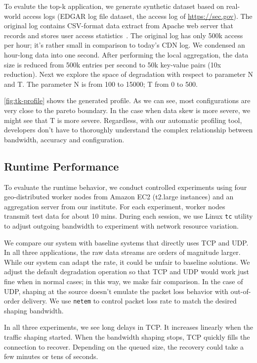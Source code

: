  To evalute the top-k application, we generate synthetic dataset
based on real-world access logs (EDGAR log file dataset, the access log of
\url{https://sec.gov}). The original log contains CSV-format data extract from
Apache web server that records and stores user access
statistics~\cite{edgarlog}. The original log has only 500k access per hour; it's
rather small in comparison to today's CDN log. We condensed an hour-long data
into one second. After performing the local aggregation, the data size is
reduced from 500k entries per second to 50k key-value pairs (10x reduction).
Next we explore the space of degradation with respect to parameter N and T.  The
parameter N is from 100 to 15000; T from 0 to 500.

\autoref{fig:tk-profile} shows the generated profile. As we can see, most
configurations are very close to the pareto boundary. In the case when data skew
is more severe, we might see that T is more severe. Regardless, with our
automatic profiling tool, developers don't have to thoroughly understand the
complex relationship between bandwidth, accuracy and configuration.

\subsection{Runtime Performance}
\label{sec:runtime-performance}

To evaluate the runtime behavior, we conduct controlled experiments using four
geo-distributed worker nodes from Amazon EC2 (t2.large instances) and an
aggregation server from our institute. For each experiment, worker nodes
transmit test data for about 10 mins. During each session, we use Linux
\texttt{tc} utility to adjust outgoing bandwidth to experiment with network
resource variation.

We compare our system with baseline systems that directly uses TCP and UDP. In
all three applications, the raw data streams are orders of magnitude
larger. While our system can adapt the rate, it could be unfair to baseline
solutions. We adjust the default degradation operation so that TCP and UDP would
work just fine when in normal cases; in this way, we make fair comparison. In
the case of UDP, shaping at the source doesn't emulate the packet loss behavior
with out-of-order delivery. We use \texttt{netem} to control packet loss rate to
match the desired shaping bandwidth.

In all three experiments, we see long delays in TCP. It increases linearly when
the traffic shaping started. When the bandwidth shaping stops, TCP quickly fills
the connection to recover. Depending on the queued size, the recovery could take
a few minutes or tens of seconds.

